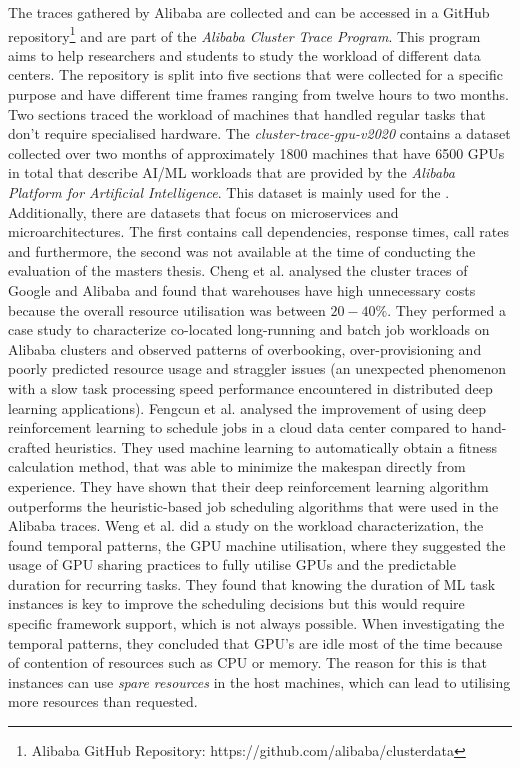         The traces gathered by Alibaba are collected and can be accessed in a GitHub repository\footnote{Alibaba GitHub Repository: https://github.com/alibaba/clusterdata} and are part of the \emph{Alibaba Cluster Trace Program}. This program aims to help researchers and students to study the workload of different data centers. The repository is split into five sections that were collected for a specific purpose and have different time frames ranging from twelve hours to two months.
        Two sections traced the workload of machines that handled regular tasks that don't require specialised hardware. The \emph{cluster-trace-gpu-v2020} contains a dataset collected over two months of approximately 1800 machines that have 6500 GPUs in total that describe AI/ML workloads that are provided by the \emph{Alibaba Platform for Artificial Intelligence}. This dataset is mainly used for the . 
        Additionally, there are datasets that focus on microservices and microarchitectures. The first contains call dependencies, response times, call rates and furthermore, the second was not available at the time of conducting the evaluation of the masters thesis. Cheng et al. \cite{chengCharacterizingColocatedDatacenter2018} analysed the cluster traces of Google and Alibaba and found that warehouses have high unnecessary costs because the overall resource utilisation was between $20-40\%$. They performed a case study to characterize co-located long-running and batch job workloads on Alibaba clusters and observed patterns of overbooking, over-provisioning and poorly predicted resource usage and straggler issues (an unexpected phenomenon with a slow task processing speed performance encountered in distributed deep learning applications). 
        Fengcun et al. \cite{fengcunDeepJSJobScheduling2023} analysed the improvement of using deep reinforcement learning to schedule jobs in a cloud data center compared to hand-crafted heuristics. They used machine learning to automatically obtain a fitness calculation method, that was able to minimize the makespan directly from experience. They have shown that their deep reinforcement learning algorithm outperforms the heuristic-based job scheduling algorithms that were used in the Alibaba traces. 
        Weng et al. \cite{wengMLaaSWildWorkload2022} did a study on the workload characterization, the found temporal patterns, the GPU machine utilisation, where they suggested the usage of GPU sharing practices to fully utilise GPUs and the predictable duration for recurring tasks. They found that knowing the duration of ML task instances is key to improve the scheduling decisions but this would require specific framework support, which is not always possible. When investigating the temporal patterns, they concluded that GPU's are idle most of the time because of contention of resources such as CPU or memory. The reason for this is that instances can use \emph{spare resources} in the host machines, which can lead to utilising more resources than requested.
         
